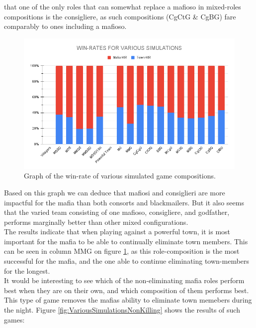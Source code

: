 that one of the only roles that can somewhat replace a mafioso in mixed-roles
compositions is the consigliere, as such compositions (CgCtG \& CgBG) fare
comparably to ones including a mafioso. \\ 
\begin{figure}[H]
    \includegraphics[width=1\linewidth]{figures/Winrates}
    \caption{Graph of the win-rate of various 
    simulated game compositions.}
    \label{fig:VariousSimulations}
\end{figure}
\vspace{-5px}Based on this graph we can deduce that mafiosi and
consiglieri are more
impactful for the mafia than both consorts and blackmailers. But it also seems
that the varied team consisting of one mafioso, consigliere, and godfather,
performs marginally better than other mixed configurations. \\
The results indicate that when playing 
against a powerful town, it is most
important for the mafia to be able to 
continually eliminate town members. This can 
be seen in column MMG on figure 
\ref{fig:VariousSimulations}, as this 
role-composition is the most successful for 
the mafia, and the one able to continue 
eliminating town-members for the longest.\\
It would be interesting to see which of the non-eliminating mafia roles perform
best when they are on their own, and which composition of them performs best.
This type of game removes the mafias ability to eliminate town memebers during the night. 
Figure \ref{fig:VariousSimulationsNonKilling} shows the results of such games:
